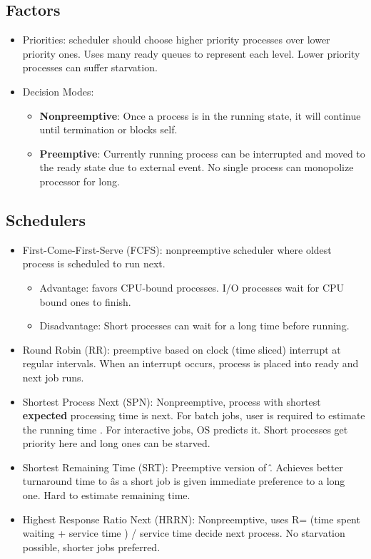 \documentclass[fontsize=4.5pt]{scrartcl}
\begin{document}
\begin{multicols}{3}
      \subsection{Factors}
        \begin{itemize}
        \item Priorities: scheduler should choose higher priority processes over lower priority ones. Uses many ready queues to represent each level. Lower priority processes can suffer starvation.
        \item Decision Modes:
          \begin{itemize}
            \item \textbf{Nonpreemptive}: Once a process is in the running state, it will continue until termination or blocks self.
            \item \textbf{Preemptive}: Currently running process can be interrupted and moved to the ready state due to external event. No single process can monopolize processor for long.
          \end{itemize}
        \end{itemize}
      \subsection{Schedulers}
        \begin{itemize}
         \item First-Come-First-Serve (FCFS): nonpreemptive scheduler where oldest process is scheduled to run next.
         \begin{itemize}
           \item Advantage: favors CPU-bound processes. I/O processes wait for CPU bound ones to finish.
           \item Disadvantage: Short processes can wait for a long time before running.
         \end{itemize}
         \item Round Robin (RR): preemptive based on clock (time sliced) interrupt at regular intervals. When an interrupt occurs, process is placed into ready and next job runs.
         \item Shortest Process Next (SPN): Nonpreemptive, process with shortest \textbf{expected} processing time is next. For batch jobs, user is required to estimate the running time
               . For interactive jobs, OS predicts it. Short processes get priority here and long ones can be starved.
         \item Shortest Remaining Time (SRT): Preemptive version of \^. Achieves better turnaround time to \^ as a short job is given immediate preference to a long one. Hard to estimate remaining time.
         \item Highest Response Ratio Next (HRRN): Nonpreemptive, uses R= (time spent waiting + service time ) / service time decide next process. No starvation possible, shorter jobs preferred.
        \end{itemize}

\end{multicols}
\end{document}
